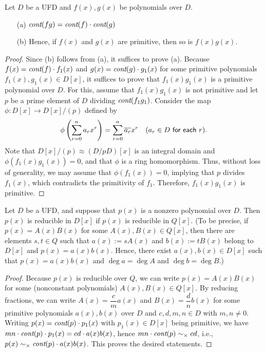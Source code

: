 \begin{thm}
    Let $D$ be a UFD and $f(x), g(x)$ be polynomials over $D$.
    \begin{enumerate}
        \item[(a)]
        {
            $\textit{cont}(fg)=\textit{cont}(f)\cdot\textit{cont}(g)$
        }
        \item[(b)]
        {
            Hence, if $f(x)$ and $g(x)$ are primitive, then so is $f(x)g(x)$.
        }
    \end{enumerate}
\end{thm}
\begin{proof}
    Since (b) follows from (a), it suffices to prove (a).
    Because $f(x)=\textit{cont}(f)\cdot f_1(x)$ and $g(x)=\textit{cont}(g)\cdot g_1(x)$ for some primitive polynomials $f_1(x), g_1(x)\in D[x]$, it suffices to prove that $f_1(x)g_1(x)$ is a primitive polynomial over $D$.
    For this, assume that $f_1(x)g_1(x)$ is not primitive and let $p$ be a prime element of $D$ dividing $\textit{cont}(f_1g_1)$.
    Consider the map $\phi: D[x]\rightarrow D[x]/(p)$ defined by
    \begin{align*}
        \phi\left(\sum_{r=0}^n a_rx^r\right)=\sum_{r=0}^n\overline{a_r}x^r\quad(a_r\in D\textsf{ for each }r).
    \end{align*}
    Note that $D[x]/(p)\approx(D/pD)[x]$ is an integral domain and $\phi(f_1(x)g_1(x))=0$, and that $\phi$ is a ring homomorphism.
    Thus, without loss of generality, we may assume that $\phi(f_1(x))=0$, implying that $p$ divides $f_1(x)$, which contradicts the primitivity of $f_1$.
    Therefore, $f_1(x)g_1(x)$ is primitive.
\end{proof}

\begin{cor}
    Let $D$ be a UFD, and suppose that $p(x)$ is a nonzero polynomial over $D$.
    Then $p(x)$ is reducible in $D[x]$ if $p(x)$ is reducible in $Q[x]$.
    (To be precise, if $p(x)=A(x)B(x)$ for some $A(x), B(x)\in Q[x]$, then there are elements $s, t\in Q$ such that $a(x):=sA(x)$ and $b(x):=tB(x)$ belong to $D[x]$ and $p(x)=a(x)b(x)$.
    Hence, there exist $a(x), b(x)\in D[x]$ such that $p(x)=a(x)b(x)$ and $\deg a=\deg A$ and $\deg b=\deg B$.)
\end{cor}
\begin{proof}
    Because $p(x)$ is reducible over $Q$, we can write $p(x)=A(x)B(x)$ for some (nonconstant polynomials) $A(x), B(x)\in Q[x]$.
    By reducing fractions, we can write $A(x)=\dfrac{c}{m}a(x)$ and $B(x)=\dfrac{d}{n}b(x)$ for some primitive polynomials $a(x), b(x)$ over $D$ and $c, d, m, n\in D$ with $m, n\neq 0$.
    Writing $p(x)=\textit{cont}(p)\cdot p_1(x)$ with $p_1(x)\in D[x]$ being primitive, we have $mn\cdot\textit{cont}(p)\cdot p_1(x)=cd\cdot a(x)b(x)$, hence $mn\cdot\textit{cont}(p)\sim_\times cd$, i.e., $p(x)\sim_\times \textit{cont}(p)\cdot a(x)b(x)$.
    This proves the desired statements.
\end{proof}

